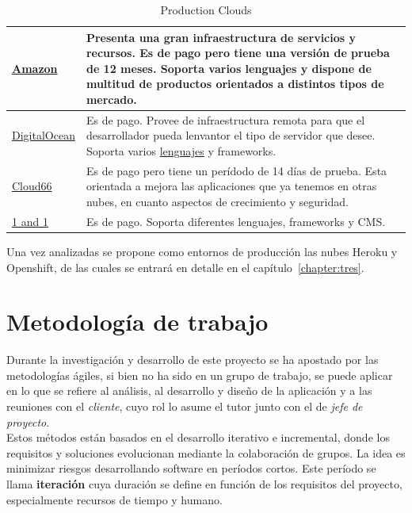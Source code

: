 \begin{table}[H]
\begin{tabular}{p{2cm} p{8cm}}
	\hline
	\href{https://aws.amazon.com/es/?nc2=h_lg}{Amazon} & Presenta una gran infraestructura de servicios y recursos. Es de pago pero tiene una versión de prueba de 12 meses. Soporta varios lenguajes y dispone de multitud de productos orientados a distintos tipos de mercado. \\
	\hline
	\href{https://www.digitalocean.com/}{DigitalOcean} & Es de pago. Provee de infraestructura remota para que el desarrollador pueda lenvantor el tipo de servidor que desee. Soporta varios \href{https://www.digitalocean.com/community/}{lenguajes} y frameworks. \\
	\hline
	\href{http://www.cloud66.com/}{Cloud66} & Es de pago pero tiene un perídodo de 14 días de prueba. Esta orientada a mejora las aplicaciones que ya tenemos en otras nubes, en cuanto aspectos de crecimiento y seguridad. \\
	\hline
	\href{http://www.1and1.es/}{1 and 1} & Es de pago. Soporta diferentes lenguajes, frameworks y CMS. \\
	\hline
	\end{tabular}
	\caption{Production Clouds}
	\label{tabla:clouds}
\end{table}

Una vez analizadas se propone como entornos de producción las nubes Heroku y Openshift, de las cuales se entrará en detalle en el capítulo~\ref{chapter:tres}.


\vspace*{0.2in}
\section{Metodología de trabajo}\label{cap.1.3}

Durante la investigación y desarrollo de este proyecto se ha apostado por las metodologías ágiles, si bien no ha sido en un grupo de trabajo, se puede aplicar en lo que se refiere al análisis, al desarrollo y diseño de la aplicación y a las reuniones con el \emph{cliente}, cuyo rol lo asume el tutor junto con el de \emph{jefe de proyecto}. \\

Estos métodos están basados en el desarrollo iterativo e incremental, donde los requisitos y soluciones evolucionan mediante la colaboración de grupos. La idea es minimizar riesgos desarrollando software en períodos cortos. Este período se llama \textbf{iteración} cuya duración se define en función de los requisitos del proyecto, especialmente recursos de tiempo y humano. \\

